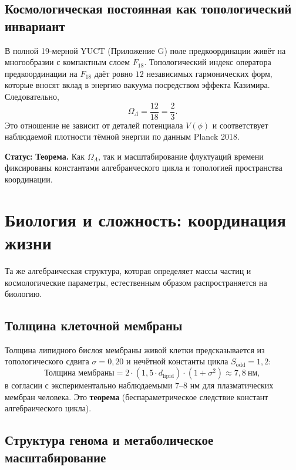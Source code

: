 \documentclass[12pt,a4paper]{article}
\begin{document}
	\subsection{Космологическая постоянная как топологический инвариант}
	
	В полной 19-мерной YUCT (Приложение G) поле предкоординации живёт на многообразии с компактным слоем \(F_{18}\). Топологический индекс оператора предкоординации на \(F_{18}\) даёт ровно \(12\) независимых гармонических форм, которые вносят вклад в энергию вакуума посредством эффекта Казимира. Следовательно,
	\begin{equation}
		\boxed{\Omega_\Lambda = \frac{12}{18} = \frac{2}{3}}.
		\label{eq:OmegaLambda}
	\end{equation}
	Это отношение не зависит от деталей потенциала \(V(\phi)\) и соответствует наблюдаемой плотности тёмной энергии по данным Planck 2018.
	
	\textbf{Статус:} \textbf{Теорема.} Как \(\Omega_\Lambda\), так и масштабирование флуктуаций времени фиксированы константами алгебраического цикла и топологией пространства координации.
	
	\section{Биология и сложность: координация жизни}
	\label{sec:biology}
	
	Та же алгебраическая структура, которая определяет массы частиц и космологические параметры, естественным образом распространяется на биологию.
	
	\subsection{Толщина клеточной мембраны}
	
	Толщина липидного бислоя мембраны живой клетки предсказывается из топологического сдвига \(\sigma = 0,20\) и нечётной константы цикла \(S_{\mathrm{odd}} = 1,2\):
	\[
	\text{Толщина мембраны} = 2 \cdot (1,5 \cdot d_{\mathrm{lipid}}) \cdot (1 + \sigma^2) \approx 7,8\ \mathrm{нм},
	\]
	в согласии с экспериментально наблюдаемыми 7--8 нм для плазматических мембран человека. Это \textbf{теорема} (беспараметрическое следствие констант алгебраического цикла).
	
	\subsection{Структура генома и метаболическое масштабирование}
	
\end{document}
